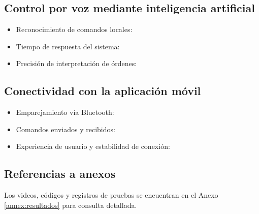 \subsection{Control por voz mediante inteligencia artificial}

\begin{itemize}
    \item Reconocimiento de comandos locales: \underline{\hspace{3cm}}
    \item Tiempo de respuesta del sistema: \underline{\hspace{3cm}}
    \item Precisión de interpretación de órdenes: \underline{\hspace{3cm}}
\end{itemize}

\subsection{Conectividad con la aplicación móvil}

\begin{itemize}
    \item Emparejamiento vía Bluetooth: \underline{\hspace{3cm}}
    \item Comandos enviados y recibidos: \underline{\hspace{3cm}}
    \item Experiencia de usuario y estabilidad de conexión: \underline{\hspace{3cm}}
\end{itemize}

\subsection{Referencias a anexos}

Los videos, códigos y registros de pruebas se encuentran en el Anexo \ref{annex:resultados} para consulta detallada.
